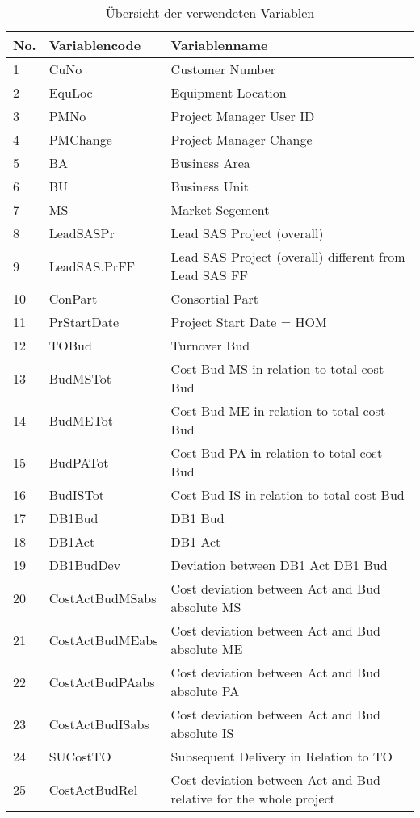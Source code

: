 \begin{longtable}[ht]{p{} p{}p{}}
	\caption{Übersicht der verwendeten Variablen}\\
	\textbf{No.} & \textbf{Variablencode} & \textbf{Variablenname} \\\hline\endfirsthead
	1     & CuNo  & Customer Number \\
	2     & EquLoc & Equipment Location \\
	3     & PMNo  & Project Manager User ID \\
	4     & PMChange & Project Manager Change \\
	5     & BA    & Business Area \\
	6     & BU    & Business Unit \\
	7     & MS    & Market Segement \\
	8     & LeadSASPr & Lead SAS Project (overall) \\
	9     & LeadSAS.PrFF & Lead SAS Project (overall) different from Lead SAS FF \\
	10    & ConPart & Consortial Part \\
	11    & PrStartDate & Project Start Date = HOM \\
	12    & TOBud & Turnover Bud \\
	13    & BudMSTot & Cost Bud MS in relation to total cost Bud \\
	14    & BudMETot & Cost Bud ME in relation to total cost Bud  \\
	15    & BudPATot & Cost Bud PA in relation to total cost Bud \\
	16    & BudISTot & Cost Bud IS in relation to total cost Bud \\
	17    & DB1Bud & DB1 Bud \\
	18    & DB1Act & DB1 Act \\
	19    & DB1BudDev & Deviation between DB1 Act DB1 Bud \\
	20    & CostActBudMSabs & Cost deviation between Act and Bud absolute MS \\
	21    & CostActBudMEabs & Cost deviation between Act and Bud absolute ME \\
	22    & CostActBudPAabs & Cost deviation between Act and Bud absolute PA \\
	23    & CostActBudISabs & Cost deviation between Act and Bud absolute IS \\
	24    & SUCostTO & Subsequent Delivery in Relation to TO \\
	25    & CostActBudRel & Cost deviation between Act and Bud relative for the whole project \\

\end{longtable}
